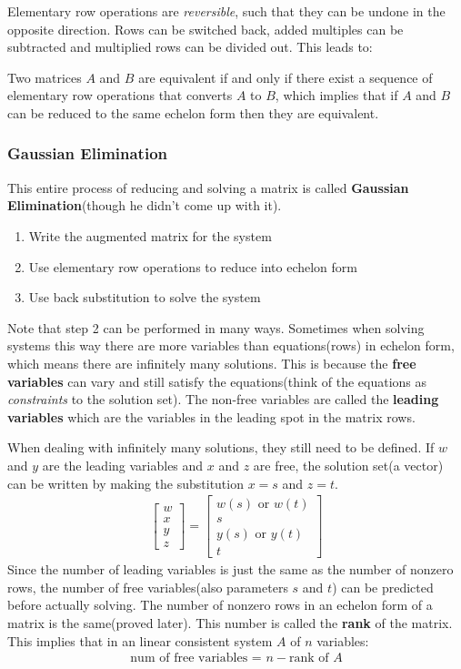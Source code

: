 \documentclass{article}
\begin{document}
Elementary row operations are \textit{reversible}, such that they can be undone in the opposite direction. Rows can be switched back, added multiples can be subtracted and multiplied rows can be divided out. This leads to:

Two matrices $A$ and $B$ are equivalent if and only if there exist a sequence of elementary row operations that converts $A$ to $B$, which implies that if $A$ and $B$ can be reduced to the same echelon form then they are equivalent.

\subsubsection{Gaussian Elimination}
This entire process of reducing and solving a matrix is called \textbf{Gaussian Elimination}(though he didn't come up with it).
\begin{enumerate}
    \item Write the augmented matrix for the system
    \item Use elementary row operations to reduce into echelon form
    \item Use back substitution to solve the system
\end{enumerate}
Note that step 2 can be performed in many ways. Sometimes when solving systems this way there are more variables than equations(rows) in echelon form, which means there are infinitely many solutions. This is because the \textbf{free variables} can vary and still satisfy the equations(think of the equations as \textit{constraints} to the solution set). The non-free variables are called the \textbf{leading variables} which are the variables in the leading spot in the matrix rows.

When dealing with infinitely many solutions, they still need to be defined. If $w$ and $y$ are the leading variables and $x$ and $z$ are free, the solution set(a vector) can be written by making the substitution $x = s$ and $z = t$.
\begin{gather*}
    \begin{bmatrix}
    w\\
    x\\
    y\\
    z
    \end{bmatrix}
     = \begin{bmatrix}
     w(s)\textrm{ or }w(t)\\
     s\\
     y(s)\textrm{ or }y(t)\\
     t
     \end{bmatrix}
\end{gather*}
Since the number of leading variables is just the same as the number of nonzero rows, the number of free variables(also parameters $s$ and $t$) can be predicted before actually solving. The number of nonzero rows in an echelon form of a matrix is the same(proved later). This number is called the \textbf{rank} of the matrix. This implies that in an linear consistent system $A$ of $n$ variables:
\begin{gather*}
    \textrm{num of free variables = } n - \textrm{rank of $A$}
\end{gather*}
\end{document}
